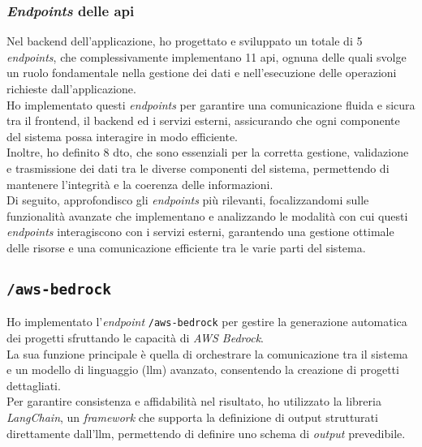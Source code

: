\subsubsection{\textit{Endpoints} delle \gls{api}}

\noindent Nel \gls{backend} dell'applicazione, ho progettato e sviluppato un totale di 5 \textit{endpoints}, che complessivamente implementano 11 \gls{api}, ognuna delle quali svolge un ruolo fondamentale nella gestione dei dati e nell'esecuzione delle operazioni richieste dall'applicazione. \\

\noindent Ho implementato questi \textit{endpoints} per garantire una comunicazione fluida e sicura tra il \gls{frontend}, il \gls{backend} ed i servizi esterni, assicurando che ogni componente del sistema possa interagire in modo efficiente.\\
Inoltre, ho definito 8 \gls{dto}, che sono essenziali per la corretta gestione, validazione e trasmissione dei dati tra le diverse componenti del sistema, permettendo di mantenere l'integrità e la coerenza delle informazioni.\\

\noindent Di seguito, approfondisco gli \textit{endpoints} più rilevanti, focalizzandomi sulle funzionalità avanzate che implementano e analizzando le modalità con cui questi \textit{endpoints} interagiscono con i servizi esterni, garantendo una gestione ottimale delle risorse e una comunicazione efficiente tra le varie parti del sistema. \\

\subsection*{\texttt{/aws-bedrock}}
Ho implementato l’\textit{endpoint} \texttt{/aws-bedrock} per gestire la generazione automatica dei progetti sfruttando le capacità di \textit{AWS Bedrock}.\\
La sua funzione principale è quella di orchestrare la comunicazione tra il sistema e un modello di linguaggio (\gls{llm}) avanzato, consentendo la creazione di progetti dettagliati.\\

\noindent Per garantire consistenza e affidabilità nel risultato, ho utilizzato la libreria \textit{LangChain}, un \textit{framework} che supporta la definizione di output strutturati direttamente dall’\gls{llm},
permettendo di definire uno schema di \textit{output} prevedibile.\\

